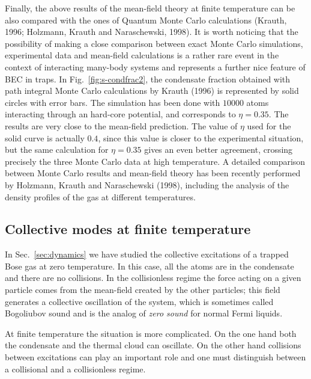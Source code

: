 Finally, the above results of the mean-field theory at finite 
temperature can be also compared with the ones of Quantum Monte 
Carlo calculations (Krauth, 1996; Holzmann, Krauth and Naraschewski, 
1998). It is worth noticing that the possibility of  making a close 
comparison between exact Monte Carlo simulations, experimental data 
and mean-field calculations is a rather rare event in the context 
of interacting many-body systems 
and represents a further nice feature of BEC in traps. In 
Fig.~\ref{fig:s-condfrac2}, the condensate fraction obtained with 
path integral Monte Carlo calculations by Krauth (1996) is represented 
by solid circles with error bars. The simulation has been done with 
$10000$ atoms interacting through an hard-core potential, and corresponds
to $\eta=0.35$. The results are very close to the mean-field prediction.
The value of $\eta$ used for the solid curve is actually $0.4$, since 
this value is closer to the experimental situation, but the same 
calculation for $\eta=0.35$ gives an even better agreement, crossing 
precisely the three Monte Carlo data at high temperature. A detailed 
comparison between Monte Carlo results and mean-field theory has been 
recently performed by Holzmann, Krauth and Naraschewski (1998), including 
the analysis of the density profiles of the gas at different temperatures. 



\subsection{Collective modes at finite temperature}
\label{sec:finiteTexcitations}

In Sec.~\ref{sec:dynamics} we have studied the collective excitations
of a trapped Bose gas at zero temperature. In this case, all the atoms
are in the condensate and there are no collisions. In the collisionless
regime the force acting on a given particle comes from the mean-field
created by the other particles; this field generates a collective
oscillation of the system, which is sometimes called Bogoliubov sound 
and is the analog of {\it zero sound} for normal Fermi liquids. 

At finite temperature the situation is more complicated. On the one
hand both the condensate and the thermal cloud can oscillate.
On the other hand collisions between excitations can play an
important role and one must distinguish between a collisional  and a
collisionless  regime. 

